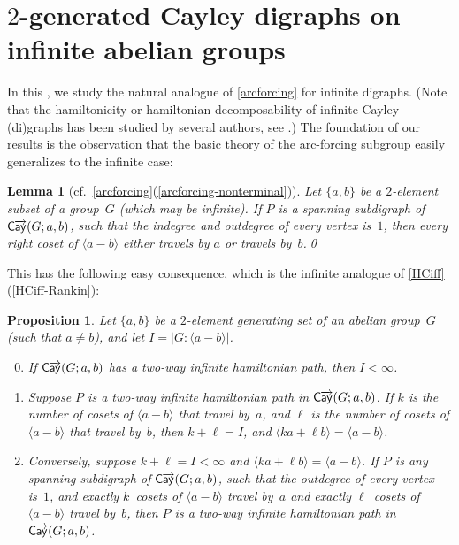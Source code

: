 \documentclass[11pt]{amsart}
\newtheorem{prop}[equation]{Proposition}
\newtheorem{lem}[equation]{Lemma}
\newcommand{\fullcref}[2]{\cref{#1}(\ref{#1-#2})}
\theoremstyle{definition}
\newcounter{case}
\numberwithin{case}{startcases}
\numberwithin{equation}{section}
\newcommand{\cayd}{\mathop{\mathsf{C}\mkern-1mu\overrightarrow{\mathsf{ay}}}}
\begin{document}
	
	
	
	
	
	\section{\texorpdfstring{$2$}{2}-generated Cayley digraphs on infinite abelian groups} \label{2genInfinite}
	
	In this , we study the natural analogue of \cref{arcforcing} for infinite digraphs. (Note that the hamiltonicity or hamiltonian decomposability of infinite Cayley (di)graphs has been studied by several authors, see \cite{BryantEtAl, ErdeLehner, ErdeLehnerPitz, jungreis1985infinite, circleabe, witte1984survey}.)
	The foundation of our results is the observation that the basic theory of the arc-forcing subgroup easily generalizes to the infinite case:
	
	\begin{lem}[cf.\ \fullcref{arcforcing}{nonterminal}] \label{coset_travel}
		Let $\{a,b\}$ be a $2$-element subset of a group~$G$ \textup(which may be infinite\textup).  If $P$ is a spanning subdigraph of $\cayd(G;a,b)$, such that the indegree and outdegree of every vertex is~$1$, then every right coset of $\langle a - b \rangle$ either travels by $a$ or travels by~$b$.\qed
	\end{lem}
	
	This has the following easy consequence, which is the infinite analogue of \fullcref{HCiff}{Rankin}:
	
	\begin{prop} \label{InfiniteHam}
		Let $\{a,b\}$ be a $2$-element generating set of an abelian group~$G$ \textup(such that $a \neq b$\textup), and let $I = |G : \langle a - b \rangle|$. 
		\begin{enumerate} \setcounter{enumi}{-1}
			\item \label{InfiniteHam-index}
			If $\cayd(G; a,b)$ has a two-way infinite hamiltonian path, then $I < \infty$.
			\item \label{InfiniteHam-assumeHP}
			Suppose $P$ is a two-way infinite hamiltonian path in $\cayd(G; a, b)$. If $k$ is the number of cosets of $\langle a - b \rangle$ that travel by~$a$, and $\ell$ is the number of cosets of $\langle a - b \rangle$ that travel by~$b$, then $k + \ell = I$, and $\langle k a + \ell b \rangle = \langle a - b \rangle$. 
			\item \label{InfiniteHam-constructHP}
			Conversely, suppose $k + \ell = I < \infty$ and $\langle k a + \ell b \rangle = \langle a - b \rangle$. If $P$ is any spanning subdigraph of $\cayd(G; a, b)$, such that the outdegree of every vertex is~$1$, and exactly $k$~cosets of $\langle a - b \rangle$ travel by~$a$ and exactly $\ell$~cosets of $\langle a - b \rangle$ travel by~$b$, then $P$ is a two-way infinite hamiltonian path in $\cayd(G; a, b)$.
		\end{enumerate}
	\end{prop}
	
\end{document}
